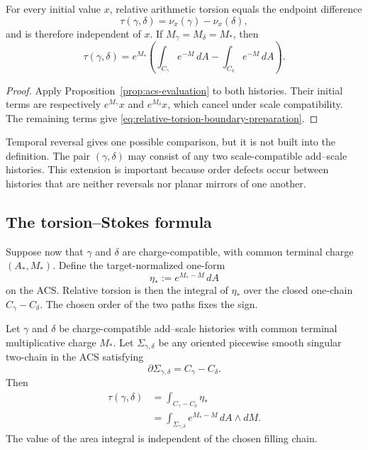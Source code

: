 \begin{proposition}
\label{prop:relative-torsion-independent}
For every initial value \(x\), relative arithmetic torsion equals the endpoint
difference
\[
    \tau(\gamma,\delta)
      =\nu_x(\gamma)-\nu_x(\delta),
\]
and is therefore independent of \(x\).
If \(M_\gamma=M_\delta=M_*\), then
\begin{equation}
    \tau(\gamma,\delta)
      =e^{M_*}
        \left(
          \int_{C_\gamma}e^{-M}\,dA
          -\int_{C_\delta}e^{-M}\,dA
        \right).
    \label{eq:relative-torsion-boundary-preparation}
\end{equation}
\end{proposition}

\begin{proof}
Apply Proposition~\ref{prop:acs-evaluation} to both histories.  Their initial
terms are respectively \(e^{M_\gamma}x\) and \(e^{M_\delta}x\), which cancel
under scale compatibility.  The remaining terms give
\eqref{eq:relative-torsion-boundary-preparation}.
\end{proof}

Temporal reversal gives one possible comparison, but it is not built into the
definition.  The pair \((\gamma,\delta)\) may consist of any two
scale-compatible add--scale histories.  This extension is important because order defects
occur between histories that are neither reversals nor planar mirrors of one
another.

\subsection{The torsion--Stokes formula}

Suppose now that \(\gamma\) and \(\delta\) are charge-compatible, with common
terminal charge \((A_*,M_*)\).  Define the target-normalized one-form
\begin{equation}
    \eta_*:=e^{M_*-M}\,dA
    \label{eq:target-normalized-acs-form}
\end{equation}
on the ACS.  Relative torsion is then the integral of \(\eta_*\) over the
closed one-chain \(C_\gamma-C_\delta\).  The chosen order of the two paths
fixes the sign.

\begin{theorem}
\label{thm:torsion-stokes}
Let \(\gamma\) and \(\delta\) be charge-compatible add--scale histories with
common terminal multiplicative charge \(M_*\).  Let
\(\Sigma_{\gamma,\delta}\) be any oriented piecewise smooth singular
two-chain in the ACS satisfying
\[
    \partial\Sigma_{\gamma,\delta}=C_\gamma-C_\delta.
\]
Then
\begin{align}
    \tau(\gamma,\delta)
      &=\int_{C_\gamma-C_\delta}\eta_*
        \label{eq:torsion-boundary-integral}\\
      &=\int_{\Sigma_{\gamma,\delta}}
          e^{M_*-M}\,dA\wedge dM.
        \label{eq:torsion-area-integral}
\end{align}
The value of the area integral is independent of the chosen filling chain.
\end{theorem}

